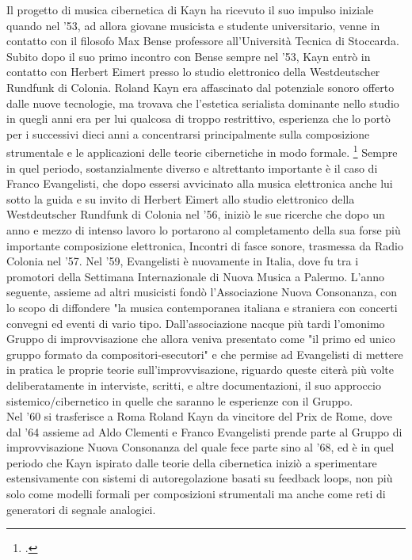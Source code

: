 Il progetto di musica cibernetica di Kayn ha ricevuto il suo impulso iniziale
quando nel '53, ad allora giovane musicista e studente universitario,
venne in contatto con il filosofo Max Bense professore all'Università Tecnica di Stoccarda.
Subito dopo il suo primo incontro con Bense sempre nel '53, Kayn entrò in contatto con Herbert
Eimert presso lo studio elettronico della Westdeutscher Rundfunk di Colonia.
Roland Kayn era affascinato dal potenziale sonoro offerto dalle nuove tecnologie,
ma trovava che l'estetica serialista dominante nello studio in quegli anni
era per lui qualcosa di troppo restrittivo, esperienza che lo portò
per i successivi dieci anni a concentrarsi
principalmente sulla composizione strumentale e le applicazioni delle teorie
cibernetiche in modo formale. \footcite{thomaswpattesonkayn}
Sempre in quel periodo, sostanzialmente diverso e altrettanto importante
è il caso di Franco Evangelisti, che dopo essersi avvicinato alla musica elettronica
anche lui sotto la guida e su invito di Herbert Eimert allo studio elettronico
della Westdeutscher Rundfunk di Colonia nel '56,
iniziò le sue ricerche che dopo un anno e mezzo di intenso lavoro lo portarono
al completamento della sua forse più importante composizione elettronica,
Incontri di fasce sonore, trasmessa da Radio Colonia nel '57.
Nel '59, Evangelisti è nuovamente in Italia, dove fu tra i promotori
della Settimana Internazionale di Nuova Musica a Palermo.
L'anno seguente, assieme ad altri musicisti
fondò l'Associazione Nuova Consonanza, con lo scopo di diffondere
"la musica contemporanea italiana e straniera con concerti convegni ed eventi di vario tipo.
Dall'associazione nacque più tardi l'omonimo Gruppo di improvvisazione
che allora veniva presentato come "il primo ed unico gruppo formato da compositori-esecutori"
e che permise ad Evangelisti di mettere in pratica le proprie teorie sull'improvvisazione,
riguardo queste citerà più volte deliberatamente in interviste, scritti,
e altre documentazioni, il suo approccio sistemico/cibernetico
in quelle che saranno le esperienze con il Gruppo. \\
Nel '60 si trasferisce a Roma Roland Kayn da vincitore del Prix de Rome,
dove dal '64 assieme ad Aldo Clementi e Franco Evangelisti
prende parte al Gruppo di improvvisazione Nuova Consonanza
del quale fece parte sino al '68,
ed è in quel periodo che Kayn ispirato dalle teorie della cibernetica iniziò a sperimentare
estensivamente con sistemi di autoregolazione basati su feedback loops,
non più solo come modelli formali per composizioni strumentali
ma anche come reti di generatori di segnale analogici. \\
